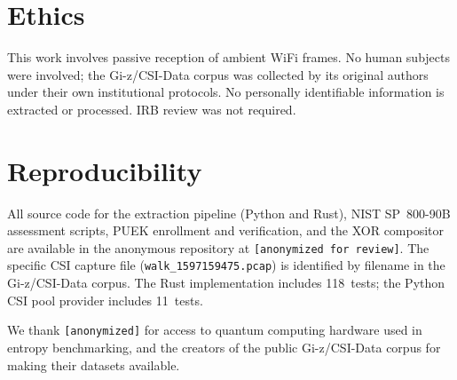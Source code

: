\documentclass[sigconf,anonymous,review]{acmart}
\begin{document}
\section*{Ethics}
This work involves passive reception of ambient WiFi frames.
No human subjects were involved; the Gi-z/CSI-Data corpus was collected by its original authors under their own institutional protocols.
No personally identifiable information is extracted or processed.
IRB review was not required.

\section*{Reproducibility}
All source code for the extraction pipeline (Python and Rust), NIST SP~800-90B assessment scripts, PUEK enrollment and verification, and the XOR compositor are available in the anonymous repository at \texttt{[anonymized for review]}.
The specific CSI capture file (\texttt{walk\_1597159475.pcap}) is identified by filename in the Gi-z/CSI-Data corpus.
The Rust implementation includes 118~tests; the Python CSI pool provider includes 11~tests.

\begin{acks}
We thank \texttt{[anonymized]} for access to quantum computing hardware used in entropy benchmarking, and the creators of the public Gi-z/CSI-Data corpus for making their datasets available.
\end{acks}



\end{document}

